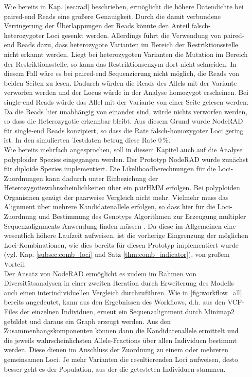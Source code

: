 Wie bereits in Kap. \ref{sec:rad} beschrieben, ermöglicht die höhere Datendichte bei paired-end Reads eine größere Genauigkeit. Durch die damit verbundene Verringerung der Überlappungen der Reads könnte den Anteil falsch-heterozygoter Loci gesenkt werden. Allerdings führt die Verwendung von paired-end Reads dazu, dass heterozygote Varianten im Bereich der Restriktionsstelle nicht erkannt werden. Liegt bei heterozygoten Varianten die Mutation im Bereich der Restriktionsstelle, so kann das Restriktionsenzym dort nicht schneiden. In diesem Fall wäre es bei paired-end Sequenzierung nicht möglich, die Reads von beiden Seiten zu lesen. Dadurch würden die Reads des Allels mit der Variante verworfen werden und der Locus würde in der Analyse homozygot erscheinen. Bei single-end Reads würde das Allel mit der Variante von einer Seite gelesen werden. Da die Reads hier unabhängig von einander sind, würde nichts verworfen werden, so dass die Heterozygotie erkennbar bleibt. Aus diesem Grund wurde NodeRAD für single-end Reads konzipiert, so dass die Rate falsch-homozygoter Loci gering ist. In den simulierten Testdaten betrug diese Rate $0 \, \%$. \\

Wie bereits mehrfach angesprochen, soll in diesem Kapitel auch auf die Analyse polyploider Spezies eingegangen werden. Der Prototyp NodeRAD wurde zunächst für diploide Spezies implementiert. Die Likelihoodberechnungen für die Loci-Zuordnungen kann dadurch unter Einbeziehung der Heterozygotiewahrscheinlichkeiten über ein pairHMM erfolgen. Bei polyploiden Organismen genügt der paarweise Vergleich nicht mehr. Vielmehr muss das Alignment über mehrere Kandidatenallele erfolgen, so dass hier für die Loci-Zuordnung und Bestimmung des Genotyps Algorithmen zur Erzeugung multipler Sequenzalignments Anwendung finden müssen \cite{chowdhury_2017,bawono_2017,chatzou_2015}. Da diese im Allgemeinen eine wesentlich höhere Laufzeit aufweisen, ist die vorherige Eingrenzung der möglichen Loci-Kombinationen, wie dies bereits für diesen Prototyp implementiert wurde (vgl. Kap. \ref{subsec:comb_loci} und Satz \ref{thm:comb_indicator}), von großem Vorteil. \\

Der Ansatz von NodeRAD ermöglicht es zudem im Rahmen von Diversitätsanalysen in einer zweiten Iteration durch Erweiterung des Modells auch einen interindividuellen Vergleich durchzuführen. Wie in \autoref{fig:workflow_all} bereits angedeutet, kann aus den Ergebnissen des Workflows, d.h. aus den VCF-Files der einzelnen Individuen, erneut ein Sequenzalignment durch Minimap2 gebildet und daraus ein Graph erzeugt werden. Aus den Zusammenhangskomponenten können dann die Kandidatenallele ermittelt und die jeweils wahrscheinlichsten Allele-Fractions über allen Individuen bestimmt werden. Diese dienen im Anschluss der Zuordnung zu einem oder mehreren gemeinsamen Loci. Je mehr Varianten die resultierenden Loci aufweisen, desto besser geht es der Population, aus der die getesteten Individuen stammen.\\

\let\cleardoublepage\clearpage
